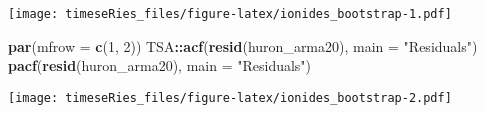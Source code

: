 \documentclass[]{book}
\newenvironment{Shaded}{\begin{snugshade}}{\end{snugshade}}
\newcommand{\DataTypeTok}[1]{\textcolor[rgb]{0.13,0.29,0.53}{#1}}
\newcommand{\DecValTok}[1]{\textcolor[rgb]{0.00,0.00,0.81}{#1}}
\newcommand{\KeywordTok}[1]{\textcolor[rgb]{0.13,0.29,0.53}{\textbf{#1}}}
\newcommand{\NormalTok}[1]{#1}
\newcommand{\OperatorTok}[1]{\textcolor[rgb]{0.81,0.36,0.00}{\textbf{#1}}}
\newcommand{\StringTok}[1]{\textcolor[rgb]{0.31,0.60,0.02}{#1}}
\begin{document}
\texttt{[image: timeseRies\_files/figure-latex/ionides\_bootstrap-1.pdf]}

\begin{Shaded}
\begin{Highlighting}[]
\KeywordTok{par}\NormalTok{(}\DataTypeTok{mfrow =} \KeywordTok{c}\NormalTok{(}\DecValTok{1}\NormalTok{, }\DecValTok{2}\NormalTok{))}
\NormalTok{TSA}\OperatorTok{::}\KeywordTok{acf}\NormalTok{(}\KeywordTok{resid}\NormalTok{(huron_arma20), }\DataTypeTok{main =} \StringTok{"Residuals"}\NormalTok{)}
\KeywordTok{pacf}\NormalTok{(}\KeywordTok{resid}\NormalTok{(huron_arma20), }\DataTypeTok{main =} \StringTok{"Residuals"}\NormalTok{)}
\end{Highlighting}
\end{Shaded}

\texttt{[image: timeseRies\_files/figure-latex/ionides\_bootstrap-2.pdf]}
\end{document}
